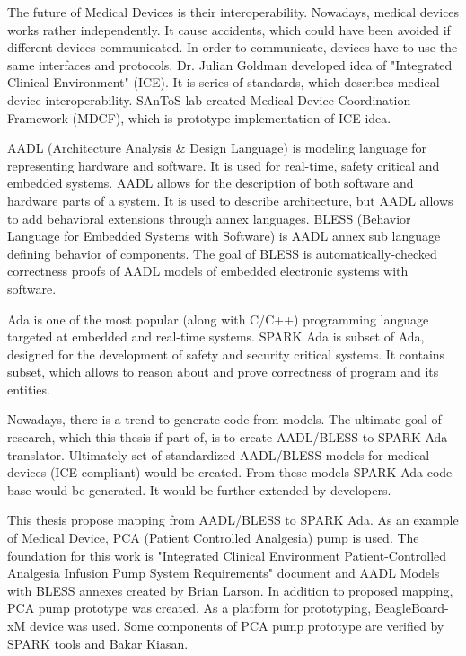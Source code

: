 
\pagestyle{empty}
\setlength{\baselineskip}{0.8cm}

\indent


The future of Medical Devices is their interoperability. Nowadays, medical devices works rather independently. It cause accidents, which could have been avoided if different devices communicated. In order to communicate, devices have to use the same interfaces and protocols. Dr. Julian Goldman developed idea of "Integrated Clinical Environment" (ICE). It is series of standards, which describes medical device interoperability. SAnToS lab created Medical Device Coordination Framework (MDCF), which is prototype implementation of ICE idea.

AADL (Architecture Analysis \& Design Language) is modeling language for representing hardware and software. It is used for real-time, safety critical and embedded systems. AADL allows for the description of both software and hardware parts of a system. It is used to describe architecture, but AADL allows to add behavioral extensions through annex languages. BLESS (Behavior Language for Embedded Systems with Software) is AADL annex sub language defining behavior of components. The goal of BLESS is automatically-checked correctness proofs of AADL models of embedded electronic systems with software.

Ada is one of the most popular (along with C/C++) programming language targeted at embedded and real-time systems. SPARK Ada is subset of Ada, designed for the development of safety and security critical systems. It contains subset, which allows to reason about and prove correctness of program and its entities.

Nowadays, there is a trend to generate code from models. The ultimate goal of research, which this thesis if part of, is to create AADL/BLESS to SPARK Ada translator. Ultimately set of standardized AADL/BLESS models for medical devices (ICE compliant) would be created. From these models SPARK Ada code base would be generated. It would be further extended by developers.

This thesis propose mapping from AADL/BLESS to SPARK Ada. As an example of Medical Device, PCA (Patient Controlled Analgesia) pump is used. The foundation for this work is "Integrated Clinical Environment Patient-Controlled Analgesia Infusion Pump System Requirements" document \cite{PcaReq} and AADL Models with BLESS annexes created by Brian Larson. In addition to proposed mapping, PCA pump prototype was created. As a platform for prototyping, BeagleBoard-xM device was used. Some components of PCA pump prototype are verified by SPARK tools and Bakar Kiasan.
